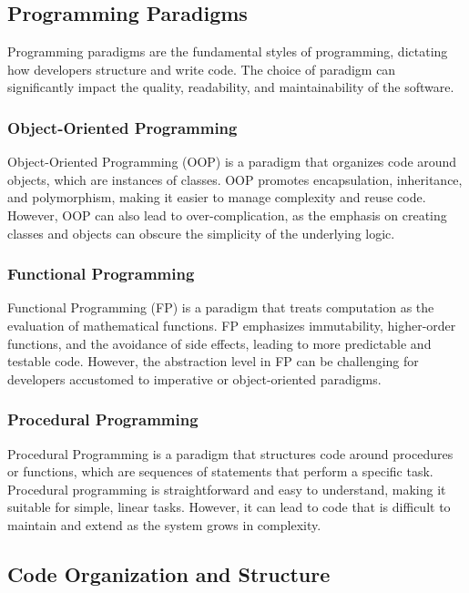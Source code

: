 \begin{refsection}
\begin{multicols}{2}
{\subsection{Programming Paradigms}

Programming paradigms are the fundamental styles of programming, dictating how developers structure and write code. The choice of paradigm can significantly impact the quality, readability, and maintainability of the software.

\subsubsection{Object-Oriented Programming}

Object-Oriented Programming (OOP) is a paradigm that organizes code around objects, which are instances of classes. OOP promotes encapsulation, inheritance, and polymorphism, making it easier to manage complexity and reuse code. However, OOP can also lead to over-complication, as the emphasis on creating classes and objects can obscure the simplicity of the underlying logic.

\subsubsection{Functional Programming}

Functional Programming (FP) is a paradigm that treats computation as the evaluation of mathematical functions. FP emphasizes immutability, higher-order functions, and the avoidance of side effects, leading to more predictable and testable code. However, the abstraction level in FP can be challenging for developers accustomed to imperative or object-oriented paradigms.

\subsubsection{Procedural Programming}

Procedural Programming is a paradigm that structures code around procedures or functions, which are sequences of statements that perform a specific task. Procedural programming is straightforward and easy to understand, making it suitable for simple, linear tasks. However, it can lead to code that is difficult to maintain and extend as the system grows in complexity.

\subsection{Code Organization and Structure}

}
\end{multicols}
\end{refsection}
